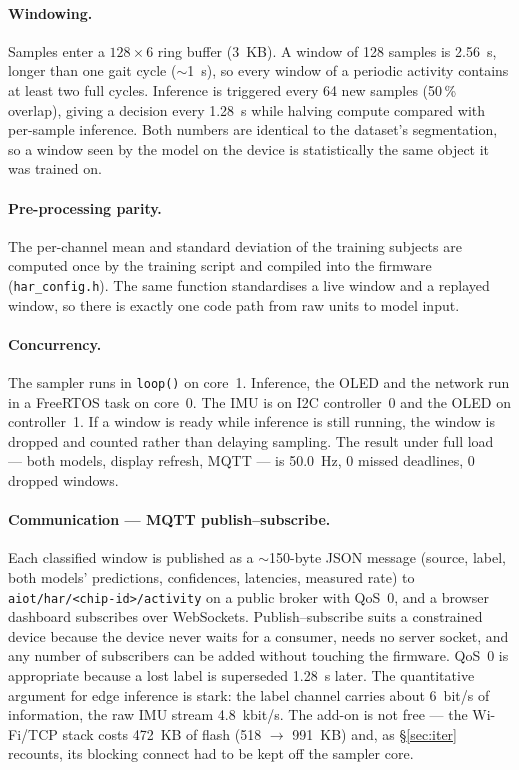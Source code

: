 \documentclass[10pt,a4paper]{article}
\begin{document}
\paragraph{Windowing.} Samples enter a $128\times6$ ring buffer (\SI{3}{KB}). A window of 128 samples is \SI{2.56}{s}, longer than one gait cycle ($\sim$\SI{1}{s}), so every window of a periodic activity contains at least two full cycles. Inference is triggered every 64 new samples (50\,\% overlap), giving a decision every \SI{1.28}{s} while halving compute compared with per-sample inference. Both numbers are identical to the dataset's segmentation, so a window seen by the model on the device is statistically the same object it was trained on.

\paragraph{Pre-processing parity.} The per-channel mean and standard deviation of the training subjects are computed once by the training script and compiled into the firmware (\texttt{har\_config.h}). The same function standardises a live window and a replayed window, so there is exactly one code path from raw units to model input.

\paragraph{Concurrency.} The sampler runs in \texttt{loop()} on core~1. Inference, the OLED and the network run in a FreeRTOS task on core~0. The IMU is on I2C controller~0 and the OLED on controller~1. If a window is ready while inference is still running, the window is dropped and counted rather than delaying sampling. The result under full load --- both models, display refresh, MQTT --- is \SI{50.0}{\hertz}, 0 missed deadlines, 0 dropped windows.

\paragraph{Communication --- MQTT publish--subscribe.} Each classified window is published as a $\sim$150-byte JSON message (source, label, both models' predictions, confidences, latencies, measured rate) to \texttt{aiot/har/<chip-id>/activity} on a public broker with QoS~0, and a browser dashboard subscribes over WebSockets. Publish--subscribe suits a constrained device because the device never waits for a consumer, needs no server socket, and any number of subscribers can be added without touching the firmware. QoS~0 is appropriate because a lost label is superseded \SI{1.28}{s} later. The quantitative argument for edge inference is stark: the label channel carries about \SI{6}{bit/s} of information, the raw IMU stream \SI{4.8}{kbit/s}. The add-on is not free --- the Wi-Fi/TCP stack costs \SI{472}{KB} of flash (518 $\rightarrow$ \SI{991}{KB}) and, as \S\ref{sec:iter} recounts, its blocking connect had to be kept off the sampler core.
\end{document}
